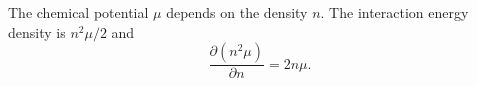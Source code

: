 \documentclass{article}
\begin{document}
The chemical potential $\mu$ depends on the density $n$. The interaction energy density is $n^2\mu/2$ and
\begin{equation}
\frac{\partial (n^2 \mu)}{\partial n} = 2 n \mu .
\label{eq:p1}
\end{equation}
\end{document}
